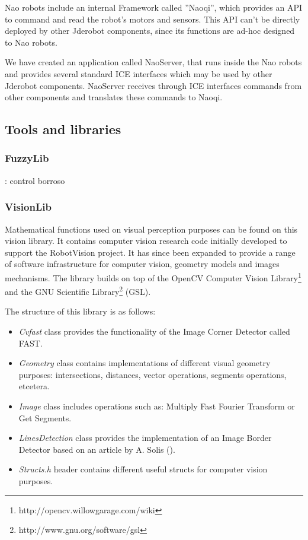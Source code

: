 \documentclass[twocolumn]{svjour3}          %
\begin{document}
Nao robots include an internal Framework called ''Naoqi'', which provides an API to command and read the robot's motors and sensors. This API can't be directly deployed by other Jderobot components, since its functions are ad-hoc designed to Nao robots.

We have created an application called NaoServer, that runs inside the Nao robots and provides several standard ICE interfaces which may be used by other Jderobot components. NaoServer receives through ICE interfaces commands from other components and translates these commands to Naoqi.

\subsection{Tools and libraries}

\subsubsection{FuzzyLib}: control borroso
\subsubsection{VisionLib}
\label{subsec:visionlib}

Mathematical functions used on visual perception purposes can be found on this vision library. It contains computer vision research code initially developed to support the RobotVision project. It has since been expanded to provide a range of software infrastructure for computer vision, geometry models and images mechanisms. The library builds on top of the OpenCV Computer Vision Library\footnote{http://opencv.willowgarage.com/wiki} and the GNU Scientific Library\footnote{http://www.gnu.org/software/gsl} (GSL).

The structure of this library is as follows:
\begin{itemize} 
\item \textit{Cvfast} class provides the functionality of the Image Corner Detector called FAST.
\item \textit{Geometry} class contains implementations of different visual geometry purposes: intersections, distances, vector operations, segments operations, etcetera.
\item \textit{Image} class includes operations such as: Multiply Fast Fourier Transform or Get Segments.
\item \textit{LinesDetection} class provides the implementation of an Image Border Detector based on an article by A. Solis (\cite{solis09}).
\item \textit{Structs.h} header contains different useful structs for computer vision purposes.
\end{itemize}
\end{document}
